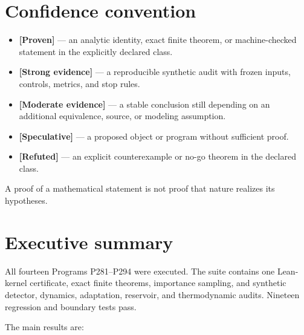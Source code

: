 \documentclass[11pt,a4paper,openany]{report}
\newcommand{\statusProven}{\textcolor{fingreen}{[Proven]}}
\newcommand{\statusStrong}{\textcolor{finblue}{[Strong evidence]}}
\newcommand{\statusModerate}{\textcolor{finviolet}{[Moderate evidence]}}
\newcommand{\statusSpeculative}{\textcolor{finorange}{[Speculative]}}
\newcommand{\statusRefuted}{\textcolor{finred}{[Refuted]}}
\begin{document}
\tableofcontents
\clearpage
{}

\chapter*{Confidence convention}

\begin{itemize}
\item 
\textbf{\statusProven{}} --- an analytic identity, exact finite theorem, or machine-checked statement in the explicitly declared class.

\item 
\textbf{\statusStrong{}} --- a reproducible synthetic audit with frozen inputs, controls, metrics, and stop rules.

\item 
\textbf{\statusModerate{}} --- a stable conclusion still depending on an additional equivalence, source, or modeling assumption.

\item 
\textbf{\statusSpeculative{}} --- a proposed object or program without sufficient proof.

\item 
\textbf{\statusRefuted{}} --- an explicit counterexample or no-go theorem in the declared class.

\end{itemize}

A proof of a mathematical statement is not proof that nature realizes its hypotheses.

\chapter{Executive summary}

All fourteen Programs P281--P294 were executed. The suite contains one Lean-kernel certificate, exact finite theorems, importance sampling, and synthetic detector, dynamics, adaptation, reservoir, and thermodynamic audits. Nineteen regression and boundary tests pass.

The main results are:
\end{document}
